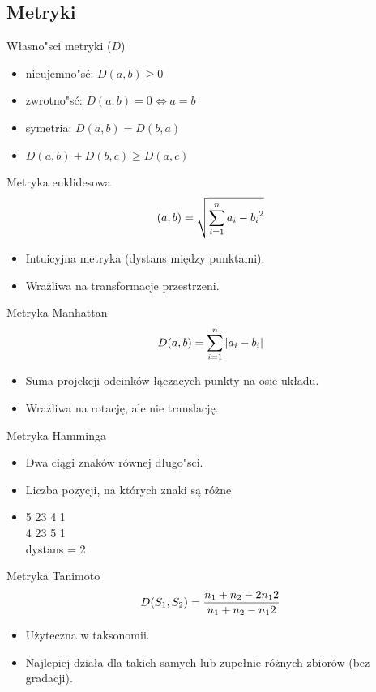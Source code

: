 \subsection{Metryki}
\begin{frame}{Własno"sci metryki ($D$)}
\begin{itemize}
	\item nieujemno"sć: $D(a,b) \ge 0$
	\item zwrotno"sć: $D(a,b) = 0 \Leftrightarrow a = b$
	\item symetria: $D(a,b) = D(b,a)$
	\item $D(a,b) + D(b,c) \ge D(a,c)$
\end{itemize}
\end{frame}

\begin{frame}{Metryka euklidesowa}
\begin{equation}
	\centering
	(a,b) = \sqrt{\sum_{i=1}^n{a_i - b_i}^2}
\end{equation}
\begin{itemize}
	\item Intuicyjna metryka (dystans między punktami).
	\item Wrażliwa na transformacje przestrzeni.
\end{itemize}
\end{frame}

\begin{frame}{Metryka Manhattan}
\begin{equation}
	\centering
	D(a,b) = \sum_{i=1}^n{|a_i - b_i|}
\end{equation}
\begin{itemize}
	\item Suma projekcji odcinków łączacych punkty na osie układu.
	\item Wrażliwa na rotację, ale nie translację.
\end{itemize}
\end{frame}

\begin{frame}{Metryka Hamminga}
\begin{itemize}
	\item Dwa ciągi znaków równej długo"sci.
	\item Liczba pozycji, na których znaki są różne
	\item {\color[rgb]{1,0,0} 5}{\color[rgb]{0,1,0} 	  23}{\color[rgb]{1,0,0} 4}{\color[rgb]{0,1,0} 1} \\
    {\color[rgb]{1,0,0} 4}{\color[rgb]{0,1,0} 23}{\color[rgb]{1,0,0} 5}{\color[rgb]{0,1,0} 1} \\
		  dystans = 2
\end{itemize}
\end{frame}

\begin{frame}{Metryka Tanimoto}
\begin{equation}
	\centering
	D(S_1,S_2) = \frac{n_1 + n_2 - 2n_12}{n_1 + n_2 - n_12}
\end{equation}
\begin{itemize}
	\item Użyteczna w taksonomii.
	\item Najlepiej działa dla takich samych lub zupełnie różnych zbiorów (bez gradacji).
\end{itemize}
\end{frame}





